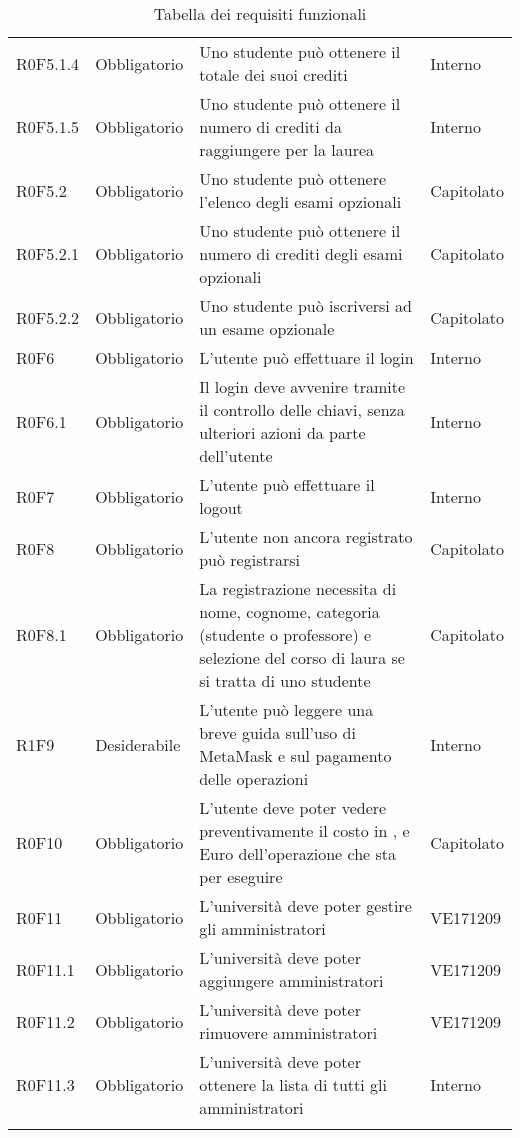 \documentclass[AnalisiDeiRequisiti.tex]{subfiles}
\begin{document}
\begin{longtable}[H]{p{2.6cm}p{2.5cm}p{5cm}p{2cm}}
	R0F5.1.4 & Obbligatorio & Uno studente può ottenere il totale dei suoi crediti & Interno \\  
	R0F5.1.5 & Obbligatorio & Uno studente può ottenere il numero di crediti da raggiungere per la laurea & Interno \\  
	R0F5.2 & Obbligatorio & Uno studente può ottenere l'elenco degli esami opzionali & Capitolato \\  
	R0F5.2.1 & Obbligatorio & Uno studente può ottenere il numero di crediti degli esami opzionali & Capitolato \\  
	R0F5.2.2 & Obbligatorio & Uno studente può iscriversi ad un esame opzionale & Capitolato \\  
	R0F6 & Obbligatorio & L'utente può effettuare il login & Interno \\  
	R0F6.1 & Obbligatorio & Il login deve avvenire tramite il controllo delle chiavi, senza ulteriori azioni da parte dell'utente & Interno \\  
	R0F7 & Obbligatorio & L'utente può effettuare il logout & Interno \\  
	R0F8 & Obbligatorio & L'utente non ancora registrato può registrarsi & Capitolato \\  
	R0F8.1 & Obbligatorio & La registrazione necessita di nome, cognome, categoria (studente o professore) e selezione del corso di laura se si tratta di uno studente & Capitolato \\  
	R1F9 & Desiderabile & L'utente può leggere una breve guida sull'uso di MetaMask e sul pagamento delle operazioni & Interno \\  	
	R0F10 & Obbligatorio & L'utente deve poter vedere preventivamente il costo in \citGloss{Gas}, \citGloss{Ether} e Euro dell'operazione che sta per eseguire & Capitolato \\  	
	R0F11 & Obbligatorio & L'università deve poter gestire gli amministratori & VE171209 \\   %
	R0F11.1 & Obbligatorio & L'università deve poter aggiungere amministratori & VE171209 \\   %
	R0F11.2 & Obbligatorio & L'università deve poter rimuovere amministratori & VE171209 \\   %
	R0F11.3 & Obbligatorio & L'università deve poter ottenere la lista di tutti gli amministratori & Interno \\
	\hiderowcolors
	\caption{Tabella dei requisiti funzionali}
\end{longtable}
\end{document}
